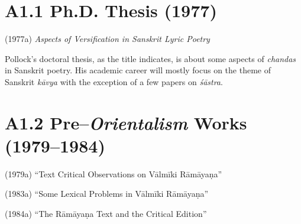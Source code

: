 \vspace{-.3cm}

\section*{A1.1 Ph.D. Thesis (1977)}

\vspace{-.2cm}

(1977a)\textit{ Aspects of Versification in Sanskrit Lyric Poetry}

Pollock’s doctoral thesis, as the title indicates, is about some aspects of \textit{chandas} in Sanskrit poetry. His academic career will mostly focus on the theme of Sanskrit \textit{kāvya} with the exception of a few papers on \textit{śāstra}.

\vspace{-.3cm}

\section*{A1.2 Pre–\textit{Orientalism} Works (1979–1984)}

\vspace{-.2cm}

(1979a) “Text Critical Observations on Vālmīki Rāmāyaṇa”

(1983a) “Some Lexical Problems in Vālmīki Rāmāyaṇa”

(1984a) “The Rāmāyaṇa Text and the Critical Edition”

